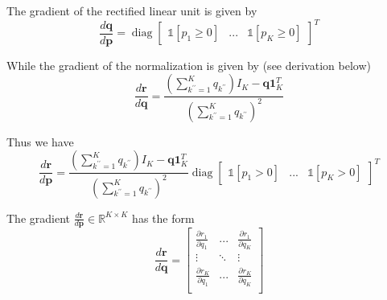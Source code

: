 \documentclass[oneside]{article}
\begin{document}
The gradient of the rectified linear unit is given by
\begin{equation}
    \frac{d \mathbf{q}}{d \mathbf{p}} = \operatorname{diag} \begin{bmatrix}
        \mathds{1} \left[ p_1 \geq 0 \right] & ... & \mathds{1} \left[ p_K \geq 0 \right]
    \end{bmatrix}^T
\end{equation}

While the gradient of the normalization is given by (see derivation below)
\begin{equation}
    \frac{d \mathbf{r}}{d \mathbf{q}} =
    \frac{\left( \sum_{k^{\prime \prime}=1}^K {q}_{k^{\prime \prime}}\right) I_K - \mathbf{q} \mathbf{1}_K^T}{\left(\sum_{k^{\prime \prime}=1}^K {q}_{k^{\prime \prime}} \right)^{2}}
\end{equation}

Thus we have
\begin{equation}
    \frac{d \mathbf{r}}{d \mathbf{p}} =
    \frac{\left( \sum_{k^{\prime \prime}=1}^K {q}_{k^{\prime \prime}}\right) I_K - \mathbf{q} \mathbf{1}_K^T}{\left(\sum_{k^{\prime \prime}=1}^K {q}_{k^{\prime \prime}} \right)^{2}} \operatorname{diag} \begin{bmatrix}
        \mathds{1} \left[ p_1 > 0 \right] & ... & \mathds{1} \left[ p_K > 0 \right]
    \end{bmatrix}^T
\end{equation}

The gradient $\frac{d \mathbf{r}}{d \mathbf{p}} \in \mathbb{R}^{K \times K}$ has the form
\begin{equation}
    \frac{d \mathbf{r}}{d \mathbf{q}} =
        \left[
            \begin{array}{ccc}
                \frac{\partial r_1}{\partial q_1} & ... & \frac{\partial r_1}{\partial q_K} \\
                \vdots & \ddots & \vdots \\
                \frac{\partial r_K}{\partial q_1} & ... & \frac{\partial r_K}{\partial q_K} \\
            \end{array}
        \right]
\end{equation}
\end{document}
